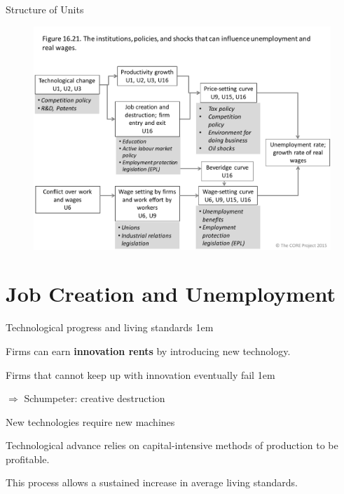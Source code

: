 \documentclass[11pt,aspectratio=43,usenames,dvipsnames]{beamer}
\let\olditemize=\itemize
\let\endolditemize=\enditemize
\renewenvironment{itemize}{\olditemize \itemsep1em}{\endolditemize}
\theoremstyle{definition}
\begin{document}
\begin{frame}{Structure of Units}
\label{slide:Structure_of_Units}
    \begin{figure}
        \centering
        \includegraphics[width=.85\textwidth]{./figures/20.pdf}
    \end{figure}

\end{frame}

\section[\faIndustry]{Job Creation and Unemployment}
\label{sec:Job_Creation_and_Unemployment}

\begin{frame}{Technological progress and living standards}
\label{slide:Technological_progress_and_living_standards}
    \begin{itemize}
        \item Firms can earn \textbf{innovation rents} by introducing new technology.
        \item Firms that cannot keep up with innovation eventually fail
        \begin{itemize}
            \item $ \Rightarrow  $ Schumpeter: creative destruction
        \end{itemize}
        \item New technologies require new machines
        \item Technological advance relies on capital-intensive methods of production to be profitable.
        \item This process allows a sustained increase in average living standards.
    \end{itemize}

\end{frame}
\end{document}

